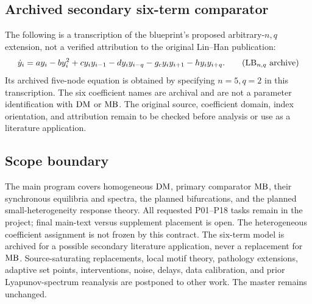\subsection{Archived secondary six-term comparator}
The following is a transcription of the blueprint's proposed arbitrary-$n,q$
extension, not a verified attribution to the original Lin--Han publication:
\begin{equation}
\label{eq:archived-lb}
\dot{y}_i=a y_i-b y_i^2+c y_i y_{i-1}-d y_i y_{i-q}
                    -g_{\mathrm c}y_i y_{i+1}-h y_i y_{i+q}.
\tag{$\LB_{n,q}$ archive}
\end{equation}
Its archived five-node equation is obtained by specifying $n=5,q=2$ in this
transcription. The six coefficient names are archival and are not a parameter
identification with $\mathrm{DM}$ or $\mathrm{MB}$. The original source, coefficient domain,
index orientation, and attribution remain to be checked before analysis or
use as a literature application.

\subsection{Scope boundary}
The main program covers homogeneous $\mathrm{DM}$, primary comparator $\mathrm{MB}$, their
synchronous equilibria and spectra, the planned bifurcations, and the planned
small-heterogeneity response theory. All requested P01--P18 tasks remain in
the project; final main-text versus supplement placement is open.
The heterogeneous coefficient assignment is not frozen by this contract.
The six-term model is archived for a possible secondary literature application,
never a replacement for $\mathrm{MB}$. Source-saturating replacements, local motif
theory, pathology extensions, adaptive set points, interventions, noise,
delays, data calibration, and prior Lyapunov-spectrum reanalysis are postponed
to other work. The master remains unchanged.
